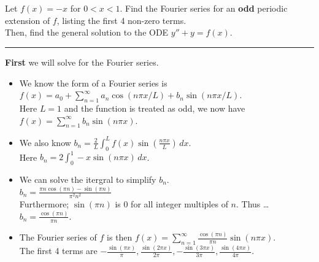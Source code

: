 \documentclass[10pt]{article}
\begin{document}
\newpage


\section{\underline{}}
\label{sec: Problem 2}

\noindent
Let $ f(x) = -x $ for $ 0 < x < 1 $.
Find the Fourier series for an \textbf{odd} periodic extension of $ f $,
listing the first 4 non-zero terms. \\
Then, find the general solution to the ODE $ y'' + y = f(x) $. \\
\vspace{2.5mm}

\hrule

\vspace{7.5mm}

\noindent
\textbf{First} we will solve for the Fourier series. \\

\begin{itemize}
    \item We know the form of a Fourier series is $ \displaystyle f(x) = a_0 + \sum_{n = 1}^{\infty} a_n \cos(n\pi x/L) + b_n \sin (n\pi x/L) $. \\
    \subitem Here $ L = 1 $ and the function is treated as odd, we now have  $ \displaystyle f(x) = \sum_{n = 1}^{\infty} b_n \sin (n\pi x) $. \\
    \item We also know $ \displaystyle b_n = \frac{2}{L} \int_{0}^{L} f(x) \sin(\frac{n\pi x}{L}) \,dx $. \\
    \subitem Here $ \displaystyle b_n = 2 \int_{0}^{1} -x \sin{(n\pi x)} \,dx $. \\
    \item We can solve the itergral to simplify $ b_n $. \\
    \subitem $ \displaystyle b_n = \frac{\pi  n \cos (\pi  n)-\sin (\pi  n)}{\pi ^2 n^2} $ \\
    \subitem Furthermore; $ \displaystyle \sin (\pi  n) $ is 0 for all integer multiples of $ n $. Thus \dots \\
    \subitem $ \displaystyle b_n = \frac{\cos(\pi n)}{\pi n} $. \\
    \item The Fourier series of $ f $ is then $ \displaystyle f(x) = \sum_{n = 1}^{\infty} \frac{\cos(\pi n)}{\pi n} \sin (n\pi x) $. \\
    \subitem The first 4 terms are $ \displaystyle -\frac{\sin (\pi  x)}{\pi },\frac{\sin (2 \pi  x)}{2 \pi },-\frac{\sin (3 \pi  x)}{3 \pi },\frac{\sin (4 \pi  x)}{4 \pi } $. \\
\end{itemize}
\end{document}

